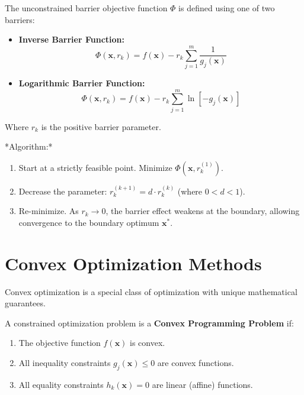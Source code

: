 \documentclass[12pt,a4paper]{article}
\begin{document}
\begin{tcolorbox}[formulabox, title={Interior Barrier Function Formulations}]
The unconstrained barrier objective function $\Phi$ is defined using one of two barriers:
\begin{itemize}[leftmargin=*, itemsep=3pt, topsep=0pt]
  \item \textbf{Inverse Barrier Function:}
    \begin{equation}
      \Phi(\mathbf{x}, r_k) = f(\mathbf{x}) - r_k \sum_{j=1}^m \frac{1}{g_j(\mathbf{x})}
    \end{equation}
  \item \textbf{Logarithmic Barrier Function:}
    \begin{equation}
      \Phi(\mathbf{x}, r_k) = f(\mathbf{x}) - r_k \sum_{j=1}^m \ln\left[ -g_j(\mathbf{x}) \right]
    \end{equation}
\end{itemize}
Where $r_k$ is the positive barrier parameter.
\par\vspace{3pt}
*Algorithm:*
\begin{enumerate}[label=\textbf{\arabic*.}, leftmargin=*, itemsep=2.5pt]
  \item Start at a strictly feasible point. Minimize $\Phi(\mathbf{x}, r_k^{(1)})$.
  \item Decrease the parameter: $r_k^{(k+1)} = d \cdot r_k^{(k)}$ (where $0 < d < 1$).
  \item Re-minimize. As $r_k \to 0$, the barrier effect weakens at the boundary, allowing convergence to the boundary optimum $\mathbf{x}^*$.
\end{enumerate}
\end{tcolorbox}

\section{Convex Optimization Methods}

Convex optimization is a special class of optimization with unique mathematical guarantees.

\begin{tcolorbox}[defbox, title={Convex Programming Problem}]
A constrained optimization problem is a \textbf{Convex Programming Problem} if:
\begin{enumerate}[label=\textbf{\arabic*.}, leftmargin=*, itemsep=2pt, topsep=0pt]
  \item The objective function $f(\mathbf{x})$ is convex.
  \item All inequality constraints $g_j(\mathbf{x}) \le 0$ are convex functions.
  \item All equality constraints $h_k(\mathbf{x}) = 0$ are linear (affine) functions.
\end{enumerate}
\end{tcolorbox}
\end{document}
